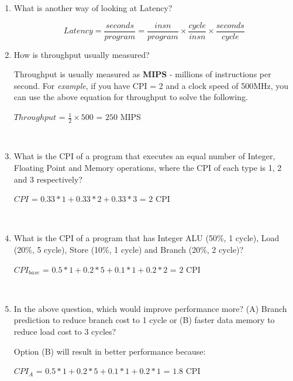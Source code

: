 \documentclass[12pt]{article}
\newenvironment{QandA}{\begin{enumerate}[label=\bfseries\arabic*.]\bfseries}
                      {\end{enumerate}}
\newenvironment{answered}{\par\quad\normalfont}{}
\begin{document}
\begin{QandA}
    \item What is another way of looking at Latency?
        \begin{answered}
        \begin{equation}
            Latency = \frac{seconds}{program} = \frac{insn}{program} \times \frac{cycle}{insn} \times \frac{seconds}{cycle}
        \end{equation}
        \end{answered}

    \item How is throughput usually measured?
        \begin{answered}
        Throughput is usually measured as \textbf{MIPS} - millions of instructions per second. For \textit{example}, if you have CPI = 2 and a clock speed of 500MHz, you can use the above equation for throughput to solve the following.
        
        $Throughput$ = $\frac{1}{2} \times 500$ = $250$ MIPS
        \end{answered}
        
        \
        
    \item What is the CPI of a program that executes an equal number of Integer, Floating Point and Memory operations, where the CPI of each type is 1, 2 and 3 respectively?
        \begin{answered}
        $CPI$ = $0.33*1+0.33*2+0.33*3$ = $2$ CPI
        \end{answered}
        
        \
        
    \item What is the CPI of a program that has Integer ALU (50\%, 1 cycle), Load (20\%, 5 cycle), Store (10\%, 1 cycle) and Branch (20\%, 2 cycle)?
        \begin{answered}
        $CPI_{base}$ = $0.5*1+0.2*5+0.1*1+0.2*2$ = $2$ CPI 
        \end{answered}
        
        \
        
    \item In the above question, which would improve performance more? (A) Branch prediction to reduce branch cost to 1 cycle or (B) faster data memory to reduce load cost to 3 cycles?
        \begin{answered}
        Option (B) will result in better performance because:
        
        $CPI_{A}$ = $0.5*1+0.2*5+0.1*1+0.2*1$ = $1.8$ CPI
        

\end{answered}
\end{QandA}
\end{document}
